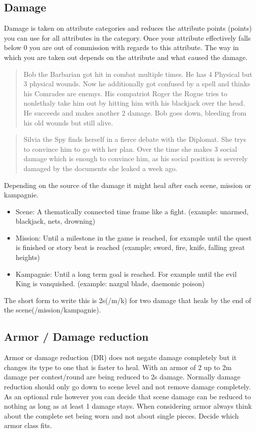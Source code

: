 \documentclass[11pt]{article}
\begin{document}
{\begin{multicols}{2}[]
\subsection{Damage}
\label{sec:org0734311}
Damage is taken on attribute categories and reduces the attribute points (points) you can use for all attributes in the category.  Once your attribute effectively falls below 0 you are out of commission with regards to this attribute. The way in which you are taken out depends on the attribute and what caused the damage.

\begin{quote}
Bob the Barbarian got hit in combat multiple times. He has 4 Physical but 3 physical wounds. Now he additionally got confused by a spell and thinks his Comrades are enemys. His compatriot Roger the Rogue tries to nonlethaly take him out by hitting him with his blackjack over the head. He succeeds and makes another 2 damage. Bob goes down, bleeding from his old wounds but still alive.
\end{quote}

\begin{quote}
Silvia the Spy finds herself in a fierce debate with the Diplomat. She trys to convince him to go with her plan. Over the time she makes 3 social damage which is enough to convince him, as his social position is severely damaged by the documents she leaked a week ago.
\end{quote}

Depending on the source of the damage it might heal after each scene, mission or kampagnie.
\begin{itemize}
\item Scene: A thematically connected time frame like a fight. (example: unarmed, blackjack, nets, drowning)
\item Mission: Until a milestone in the game is reached, for example until the quest is finished or story beat is reached (example; sword, fire, knife, falling great heights)
\item Kampagnie: Until a long term goal is reached. For example until the evil King is vanquished. (example: nazgul blade, daemonic poison)
\end{itemize}
The short form to write this is 2s(/m/k) for two damage that heals by the end of the scene(/mission/kampagnie).

\subsection{Armor / Damage reduction}
\label{sec:org5354287}
Armor or damage reduction (DR) does not negate damage completely but it changes its type to one that is faster to heal. With an armor of 2 up to 2m damage per contest/round are being reduced to 2s damage. Normally damage reduction should only go down to scene level and not remove damage completely. As an optional rule however you can decide that scene damage can be reduced to nothing as long as at least 1 damage stays. When considering armor always think about the complete set being worn and not about single pieces. Decide which armor class fits.


\end{multicols}}
\end{document}
